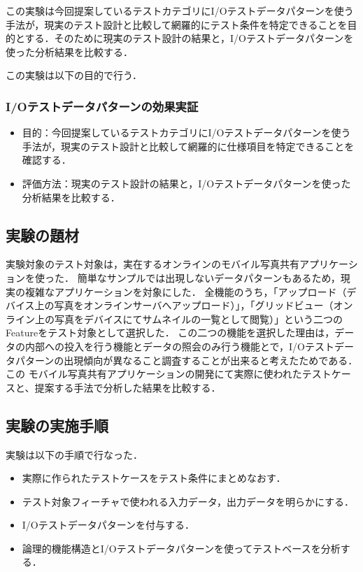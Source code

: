 この実験は今回提案しているテストカテゴリにI/Oテストデータパターンを使う手法が，現実のテスト設計と比較して網羅的にテスト条件を特定できることを目的とする．そのために現実のテスト設計の結果と，I/Oテストデータパターンを使った分析結果を比較する．

この実験は以下の目的で行う．

\subsubsection{I/Oテストデータパターンの効果実証}
\begin{itemize}
\item 目的：今回提案しているテストカテゴリにI/Oテストデータパターンを使う手法が，現実のテスト設計と比較して網羅的に仕様項目を特定できることを確認する．
\item 評価方法：現実のテスト設計の結果と，I/Oテストデータパターンを使った分析結果を比較する．
\end{itemize}

\subsection{実験の題材} \label{sec:4-2-3}

実験対象のテスト対象は，実在するオンラインのモバイル写真共有アプリケーションを使った．
簡単なサンプルでは出現しないデータパターンもあるため，現実の複雑なアプリケーションを対象にした．
全機能のうち，「アップロード（デバイス上の写真をオンラインサーバへアップロード）」，「グリッドビュー（オンライン上の写真をデバイスにてサムネイルの一覧として閲覧）」という二つのFeatureをテスト対象として選択した．
この二つの機能を選択した理由は，データの内部への投入を行う機能とデータの照会のみ行う機能とで，I/Oテストデータパターンの出現傾向が異なること調査することが出来ると考えたためである．この
モバイル写真共有アプリケーションの開発にて実際に使われたテストケースと、提案する手法で分析した結果を比較する．

\subsection{実験の実施手順}
実験は以下の手順で行なった．

\begin{itemize}
\item 実際に作られたテストケースをテスト条件にまとめなおす．
\item テスト対象フィーチャで使われる入力データ，出力データを明らかにする．
\item I/Oテストデータパターンを付与する．
\item 論理的機能構造とI/Oテストデータパターンを使ってテストベースを分析する．
\end{itemize}

